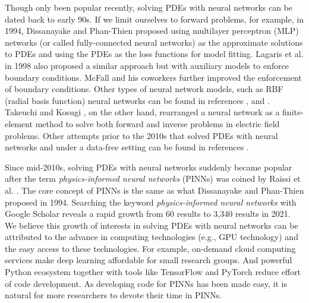Though only been popular recently, solving PDEs with neural networks can be dated back to early 90s.
If we limit ourselves to forward problems, for example, in 1994, Dissanayake and Phan-Thien \cite{dissanayake_neural-network-based_1994} proposed using multilayer perceptron (MLP) networks (or called fully-connected neural networks) as the approximate solutions to PDEs and using the PDEs as the loss functions for model fitting.
Lagaris et al. in 1998 \cite{lagaris_artificial_1998} also proposed a similar approach but with auxiliary models to enforce boundary conditions.
McFall and his coworkers \cite{McFall2009,mcfall_solving_2010} further improved the enforcement of boundary conditions.
Other types of neural network models, such as RBF (radial basis function) neural networks can be found in references \cite{li_numerical_2003,mai-duy_numerical_2001,demirkaya_direct_2008}, and \cite{li_integration_2010}.
Takeuchi and Kosugi \cite{takeuchi_neural_1994}, on the other hand, rearranged a neural network as a finite-element method to solve both forward and inverse problems in electric field problems.
Other attempts prior to the 2010s that solved PDEs with neural networks and under a data-free setting can be found in references \cite{yadav_introduction_2015}.

Since mid-2010s, solving PDEs with neural networks suddenly became popular after the term {\it physics-informed neural networks} (PINNs) was coined by Raissi et al. \cite{raissi_physics-informed_2017}.
The core concept of PINNs is the same as what Dissanayake and Phan-Thien proposed in 1994.
Searching the keyword {\it physics-informed neural networks} with Google Scholar reveals a rapid growth from 60 results to 3,340 results in 2021.
We believe this growth of interests in solving PDEs with neural networks can be attributed to the advance in computing technologies (e.g., GPU technology) and the easy access to these technologies.
For example, on-demand cloud computing services make deep learning affordable for small research groups.
And powerful Python ecosystem together with tools like TensorFlow and PyTorch reduce effort of code development.
As developing code for PINNs has been made easy, it is natural for more researchers to devote their time in PINNs.


